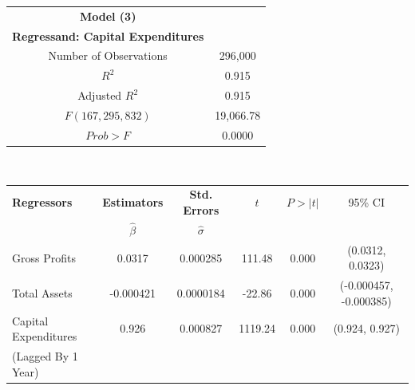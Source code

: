 \begin{table}[h]
\begin{tabular}{ c | c }
	\hline
	\textbf{Model (3)} \\
    \textbf{Regressand: Capital Expenditures} \\
    \hline \hline
    Number of Observations & 296,000 \\
	\hline
    $R^{2}$ & 0.915 \\
    Adjusted $R^{2}$ & 0.915 \\
    \hline
    $F(167, 295,832)$ & 19,066.78 \\
    $Prob > F$ & 0.0000 \\
    \hline \hline
\end{tabular} \\

\begin{tabular}{ l | c | c | c | c | c }
	\hline
	\textbf{Regressors} & \textbf{Estimators} & \textbf{Std. Errors} & $t$ & $P > |t|$ & 95\% CI \\
    & $\hat{\beta}$ & $\hat{\sigma}$ & & & \\
    \hline \hline
	Gross Profits & 0.0317 & 0.000285  & 111.48 & 0.000 & (0.0312, 0.0323) \\
	\hline
    Total Assets & -0.000421 & 0.0000184 & -22.86 & 0.000 & (-0.000457, -0.000385) \\
    \hline
    Capital Expenditures & 0.926 & 0.000827 & 1119.24 & 0.000 & (0.924, 0.927) \\
    (Lagged By 1 Year) & & & & & \\
    \hline \hline
\end{tabular}
\end{table}

